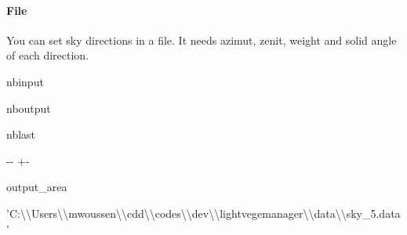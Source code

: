 \documentclass[letterpaper,10pt,english]{sphinxmanual}
\begin{document}
\paragraph{File}
\label{\detokenize{environment_parameters:File}}
\sphinxAtStartPar
You can set sky directions in a file. It needs azimut, zenit, weight and solid angle of each direction.

\begin{sphinxuseclass}{nbinput}
{
\begin{sphinxVerbatim}[commandchars=\\\{\}]
\llap{\color{nbsphinxin}[7]:\,\hspace{\fboxrule}\hspace{\fboxsep}} 
    
\end{sphinxVerbatim}
}

\end{sphinxuseclass}
\begin{sphinxuseclass}{nboutput}
\begin{sphinxuseclass}{nblast}
{

\kern-\sphinxverbatimsmallskipamount\kern-\baselineskip
\kern+\FrameHeightAdjust\kern-\fboxrule
\vspace{\nbsphinxcodecellspacing}

\begin{sphinxuseclass}{output_area}
\begin{sphinxuseclass}{}


\begin{sphinxVerbatim}[commandchars=\\\{\}]
\llap{\color{nbsphinxout}[7]:\,\hspace{\fboxrule}\hspace{\fboxsep}}'C:\textbackslash{}\textbackslash{}Users\textbackslash{}\textbackslash{}mwoussen\textbackslash{}\textbackslash{}cdd\textbackslash{}\textbackslash{}codes\textbackslash{}\textbackslash{}dev\textbackslash{}\textbackslash{}lightvegemanager\textbackslash{}\textbackslash{}data\textbackslash{}\textbackslash{}sky\_5.data'
\end{sphinxVerbatim}



\end{sphinxuseclass}
\end{sphinxuseclass}
}

\end{sphinxuseclass}
\end{sphinxuseclass}
\end{document}
